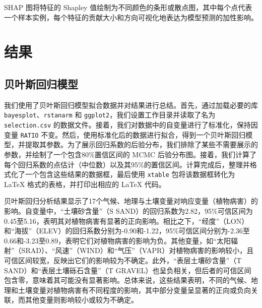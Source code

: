 \documentclass[AutoFakeBold]{LZUThesis-PgD&PhD}
\begin{document}
	SHAP 图将特征的 Shapley 值绘制为不同颜色的条形或散点图，其中每个点代表一个样本实例，每个特征的贡献大小和方向可视化地表达为模型预测的加性影响。
	\chapter{结果}
	
	\section{贝叶斯回归模型}
	我们使用了贝叶斯回归模型拟合数据并对结果进行总结。首先，通过加载必要的库 \texttt{bayesplot}、\texttt{rstanarm} 和 \texttt{ggplot2}，我们设置工作目录并读取了名为 \texttt{selection.csv} 的数据文件。接着，我们对数据中的自变量进行了标准化，保持因变量 \texttt{RATIO} 不变。然后，使用标准化后的数据进行拟合，得到一个贝叶斯回归模型，并提取其参数。为了展示回归系数的后验分布，我们排除了某些不需要展示的参数，并绘制了一个包含80\%置信区间的 MCMC 后验分布图。接着，我们计算了每个回归系数的点估计（中位数）以及其95\%的置信区间。计算完成后，整理并格式化了一个包含这些结果的数据框，最后使用 \texttt{xtable} 包将该数据框转化为 LaTeX 格式的表格，并打印出相应的 LaTeX 代码。
	
	贝叶斯回归分析结果显示了17个气候、地理与土壤变量对响应变量（植物病害）的影响。自变量中，“土壤砂含量”（S SAND）的回归系数为2.82，95\%可信区间为0.45至5.16，表明其对植物病害有显著的正向影响。相比之下，“经度”（LON）和“海拔”（ELEV）的回归系数分别为-0.90和-1.22，95\%可信区间分别为-2.36至0.66和-3.23至0.89，表明它们对植物病害的影响为负。其他变量，如“太阳辐射”（SRAD）、“风速”（WIND）和“气压”（VAPR）对植物病害的影响较小，且可信区间较宽，反映出它们的影响较为不确定。此外，“表层土壤砂含量”（T SAND）和“表层土壤砾石含量”（T GRAVEL）也呈负相关，但后者的可信区间包含零，意味着其可能没有显著影响。总体来说，这些结果表明，不同的气候、地理和土壤变量对植物病害有不同程度的影响，其中部分变量呈显著的正向或负向关联，而其他变量则影响较小或较为不确定。
	
\end{document}
